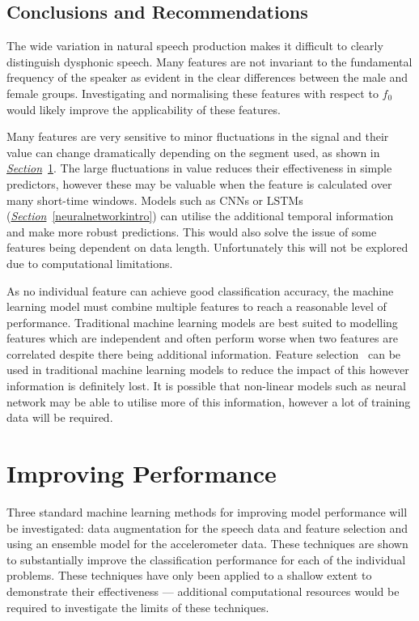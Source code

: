 \documentclass[12pt, twoside]{book}
\begin{document}
\subsection{Conclusions and Recommendations}
\label{visfeatrecommendations}
The wide variation in natural speech production makes it difficult to clearly distinguish dysphonic speech. Many features are not invariant to the fundamental frequency of the speaker as evident in the clear differences between the male and female groups. Investigating and normalising these features with respect to $f_0$ would likely improve the applicability of these features.

Many features are very sensitive to minor fluctuations in the signal and their value can change dramatically depending on the segment used, as shown in \textit{\hyperref[dataaugment]{Section}}~\ref{dataaugment}. The large fluctuations in value reduces their effectiveness in simple predictors, however these may be valuable when the feature is calculated over many short-time windows. Models such as CNNs or LSTMs (\textit{\hyperref[neuralnetworkintro]{Section}}~\ref{neuralnetworkintro}) can utilise the additional temporal information and make more robust predictions. This would also solve the issue of some features being dependent on data length. Unfortunately this will not be explored due to computational limitations.

As no individual feature can achieve good classification accuracy, the machine learning model must combine multiple features to reach a reasonable level of performance. Traditional machine learning models are best suited to modelling features which are independent and often perform worse when two features are correlated despite there being additional information. Feature selection~\cite{skfeature} can be used in traditional machine learning models to reduce the impact of this however information is definitely lost. It is possible that non-linear models such as neural network may be able to utilise more of this information, however a lot of training data will be required.

\section{Improving Performance}
\label{dataaugment}
Three standard machine learning methods for improving model performance will be investigated: data augmentation for the speech data and feature selection and using an ensemble model for the accelerometer data. These techniques are shown to substantially improve the classification performance for each of the individual problems. These techniques have only been applied to a shallow extent to demonstrate their effectiveness --- additional computational resources would be required to investigate the limits of these techniques.
\end{document}
